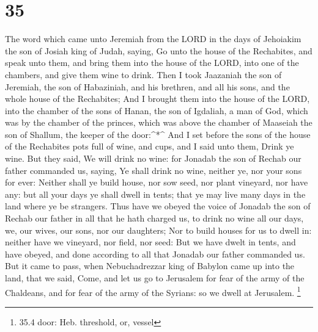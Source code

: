 \hypertarget{section-34}{%
\section{35}\label{section-34}}

 The word which came unto Jeremiah from the LORD in the days
of Jehoiakim the son of Josiah king of Judah, saying,  Go
unto the house of the Rechabites, and speak unto them, and bring them
into the house of the LORD, into one of the chambers, and give them wine
to drink.  Then I took Jaazaniah the son of Jeremiah, the
son of Habaziniah, and his brethren, and all his sons, and the whole
house of the Rechabites;  And I brought them into the house
of the LORD, into the chamber of the sons of Hanan, the son of Igdaliah,
a man of God, which was by the chamber of the princes, which was above
the chamber of Maaseiah the son of Shallum, the keeper of the
door:\^{}*\^{}  And I set before the sons of the house of
the Rechabites pots full of wine, and cups, and I said unto them, Drink
ye wine.  But they said, We will drink no wine: for Jonadab
the son of Rechab our father commanded us, saying, Ye shall drink no
wine, neither ye, nor your sons for ever:  Neither shall ye
build house, nor sow seed, nor plant vineyard, nor have any: but all
your days ye shall dwell in tents; that ye may live many days in the
land where ye be strangers.  Thus have we obeyed the voice
of Jonadab the son of Rechab our father in all that he hath charged us,
to drink no wine all our days, we, our wives, our sons, nor our
daughters;  Nor to build houses for us to dwell in: neither
have we vineyard, nor field, nor seed:  But we have dwelt
in tents, and have obeyed, and done according to all that Jonadab our
father commanded us.  But it came to pass, when
Nebuchadrezzar king of Babylon came up into the land, that we said,
Come, and let us go to Jerusalem for fear of the army of the Chaldeans,
and for fear of the army of the Syrians: so we dwell at Jerusalem.
\footnote{35.4 door: Heb. threshold, or, vessel}


